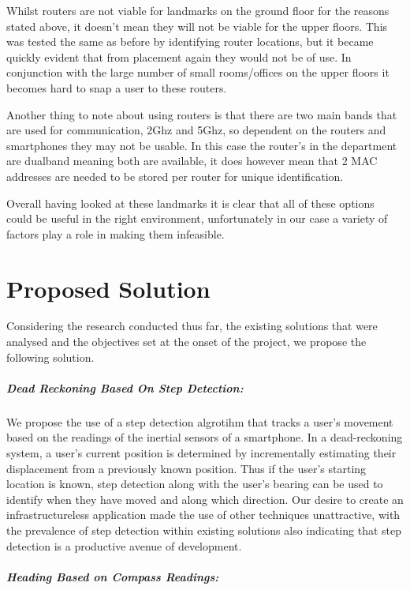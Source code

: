 \documentclass[12pt,a4paper]{report}
\begin{document}
Whilst routers are not viable for landmarks on the ground floor for the reasons stated above, it doesn't mean they will not be viable for the upper floors. This was tested the same as before by identifying router locations, but it became quickly evident that from placement again they would not be of use. In conjunction with the large number of small rooms/offices on the upper floors it becomes hard to snap a user to these routers.

Another thing to note about using routers is that there are two main bands that are used for communication, 2Ghz and 5Ghz, so dependent on the routers and smartphones they may not be usable. In this case the router's in the department are dualband meaning both are available, it does however mean that 2 MAC addresses are needed to be stored per router for unique identification.

Overall having looked at these landmarks it is clear that all of these options could be useful in the right environment, unfortunately in our case a variety of factors play a role in making them infeasible.

\chapter{Proposed Solution}

Considering the research conducted thus far, the existing solutions that were analysed and the objectives set at the onset of the project, we propose the following solution.

\paragraph{Dead Reckoning Based On Step Detection:}

We propose the use of a step detection algrotihm that tracks a user's movement based on the readings of the inertial sensors of a smartphone. In a dead-reckoning system, a user's current position is determined by incrementally estimating their displacement from a previously known position. Thus if the user's starting location is known, step detection along with the user's bearing can be used to identify when they have moved and along which direction. Our desire to create an infrastructureless application made the use of other techniques unattractive, with the prevalence of step detection within existing solutions also indicating that step detection is a productive avenue of development.

\paragraph{Heading Based on Compass Readings:}
\end{document}
